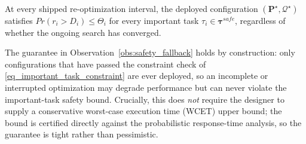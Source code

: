     \begin{observation}
    \label{obs:safety_fallback}
    At every shipped re-optimization interval, the deployed configuration $(\boldsymbol{P}^{\star},\boldsymbol{\mathcal{Q}}^{\star})$ satisfies $Pr(r_i > D_i) \leq \Theta_i$ for every important task $\tau_i \in \boldsymbol{\tau}^{safe}$, regardless of whether the ongoing search has converged.
    \end{observation}

    The guarantee in Observation~\ref{obs:safety_fallback} holds by construction: only configurations that have passed the constraint check of \eqref{eq_important_task_constraint} are ever deployed, so an incomplete or interrupted optimization may degrade performance but can never violate the important-task safety bound.
    Crucially, this does \emph{not} require the designer to supply a conservative worst-case execution time (WCET) upper bound; the bound is certified directly against the probabilistic response-time analysis, so the guarantee is tight rather than pessimistic.
